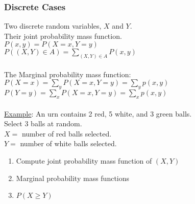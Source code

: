     \subsubsection*{Discrete Cases}
      Two discrete random variables, $X$ and $Y$.\\
      Their joint probability mass function.\\
      $P(x,y) = P(X = x, Y = y)$\\
      $P((X,Y) \in A) = \sum_{(X,Y) \in A} P(x,y)$\\\\
      The Marginal probability mass function:\\
      $P(X = x) = \sum_y P(X=x, Y=y) = \sum_y p(x,y)$\\
      $P(Y = y) = \sum_x P(X=x, Y=y) = \sum_x p(x,y)$\\\\
    \underline{Example}: An urn contains 2 red, 5 white, and 3 green balls.\\
      Select 3 balls at random.\\
      $X = $ number of red balls selected.\\
      $Y = $ number of white balls selected.\\
      \begin{enumerate}
        \item Compute joint probability mass function of $(X,Y)$
        \item Marginal probability mass functions
        \item $P(X \ge Y)$
      \end{enumerate}
